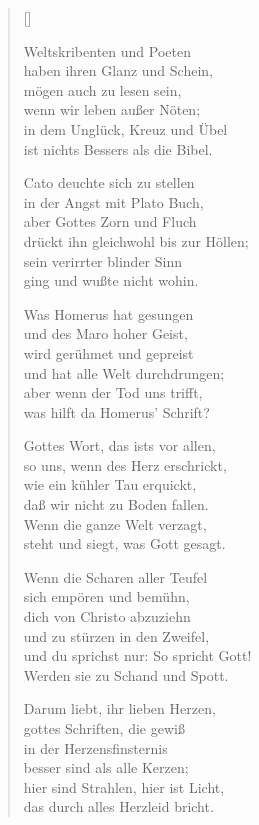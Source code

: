\begin{multicols}{2}
\settowidth{\versewidth}{Gottes Wort, das ists vor allen,}
\begin{verse}[\versewidth]

 Weltskribenten und Poeten\\
haben ihren Glanz und Schein,\\
mögen auch zu lesen sein,\\
wenn wir leben außer Nöten;\\
in dem Unglück, Kreuz und Übel\\
ist nichts Bessers als die Bibel.

 Cato deuchte sich zu stellen\\
in der Angst mit Plato Buch,\\
aber Gottes Zorn und Fluch\\
drückt ihn gleichwohl bis zur Höllen;\\
sein verirrter blinder Sinn\\
ging und wußte nicht wohin.

 Was Homerus hat gesungen\\
und des Maro hoher Geist,\\
wird gerühmet und gepreist\\
und hat alle Welt durchdrungen;\\
aber wenn der Tod uns trifft,\\
was hilft da Homerus' Schrift?

 Gottes Wort, das ists vor allen,\\
so uns, wenn des Herz erschrickt,\\
wie ein kühler Tau erquickt,\\
daß wir nicht zu Boden fallen.\\
Wenn die ganze Welt verzagt,\\
steht und siegt, was Gott gesagt.

 Wenn die Scharen aller Teufel\\
sich empören und bemühn,\\
dich von Christo abzuziehn\\
und zu stürzen in den Zweifel,\\
und du sprichst nur: So spricht Gott!\\
Werden sie zu Schand und Spott.

 Darum liebt, ihr lieben Herzen,\\
gottes Schriften, die gewiß\\
in der Herzensfinsternis\\
besser sind als alle Kerzen;\\
hier sind Strahlen, hier ist Licht,\\
das durch alles Herzleid bricht.
\end{verse}
\end{multicols}

